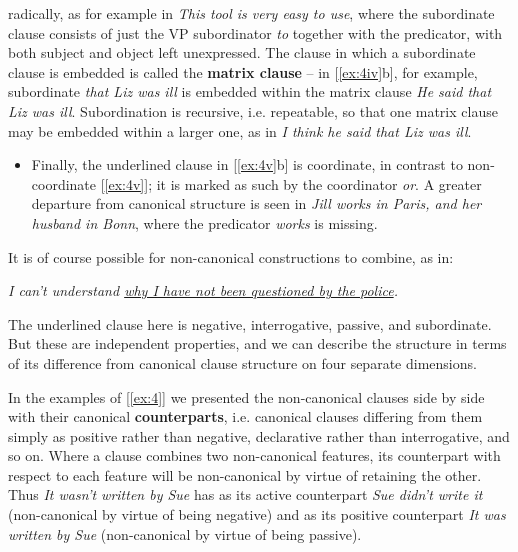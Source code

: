 \noindent radically, as for example in \textit{This tool is very easy to use}, where the subordinate clause consists of just the VP subordinator \textit{to} together with the predicator, with both subject and object left unexpressed. The clause in which a subordinate clause is embedded is called the \textbf{matrix clause} -- in [\ref{ex:4iv}b], for example, subordinate \textit{that Liz was ill} is embedded within the matrix clause \textit{He said that Liz was ill}. Subordination is {recursive}, i.e. repeatable, so that one matrix clause may be embedded within a larger one, as in \textit{I think he said that Liz was ill}.
\begin{itemize}
    \item Finally, the underlined clause in [\ref{ex:4v}b] is {coordinate}, in contrast to non-coordinate [\ref{ex:4v}]; it is marked as such by the coordinator \textit{or}. A greater departure from canonical structure is seen in \textit{Jill works in Paris, and her husband in Bonn}, where the predicator \textit{works} is missing.
\end{itemize}
It is of course possible for non-canonical constructions to combine, as in:
\begin{examples}
    \item \label{ex:5} \itshape I can't understand \uline{why I have not been questioned by the police}.
\end{examples}

The underlined clause here is negative, interrogative, passive, and subordinate. But these are independent properties, and we can describe the structure in terms of its difference from canonical clause structure on four separate dimensions.

In the examples of [\ref{ex:4}] we presented the non-canonical clauses side by side with their canonical \textbf{counterparts}, i.e. canonical clauses differing from them simply as positive rather than negative, declarative rather than interrogative, and so on. Where a clause combines two non-canonical features, its counterpart with respect to each feature will be non-canonical by virtue of retaining the other. Thus \textit{It wasn't written by Sue} has as its active counterpart \textit{Sue didn't write it} (non-canonical by virtue of being negative) and as its positive counterpart \textit{It was written by Sue} (non-canonical by virtue of being passive).

